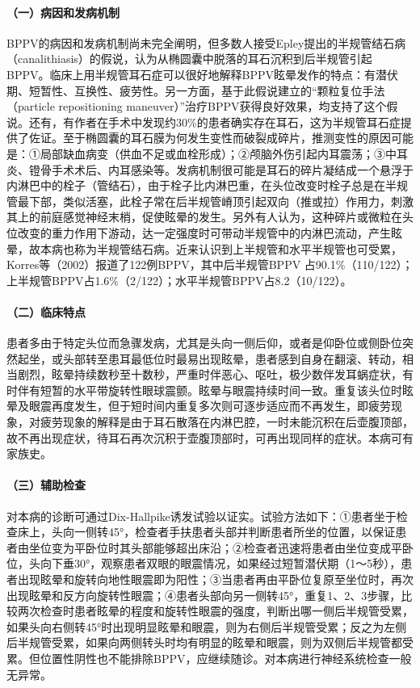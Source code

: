 \paragraph{（一）病因和发病机制}

BPPV的病因和发病机制尚未完全阐明，但多数人接受Epley提出的半规管结石病（canalithiasis）的假说，认为从椭圆囊中脱落的耳石沉积到后半规管引起BPPV。临床上用半规管耳石症可以很好地解释BPPV眩晕发作的特点：有潜伏期、短暂性、互换性、疲劳性。另一方面，基于此假说建立的“颗粒复位手法（particle
repositioning
maneuver）”治疗BPPV获得良好效果，均支持了这个假说。还有，有作者在手术中发现约30\%的患者确实存在耳石，这为半规管耳石症提供了佐证。至于椭圆囊的耳石膜为何发生变性而破裂成碎片，推测变性的原因可能是：①局部缺血病变（供血不足或血栓形成）；②颅脑外伤引起内耳震荡；③中耳炎、镫骨手术术后、内耳感染等。发病机制很可能是耳石的碎片凝结成一个悬浮于内淋巴中的栓子（管结石），由于栓子比内淋巴重，在头位改变时栓子总是在半规管最下部，类似活塞，此栓子常在后半规管嵴顶引起双向（推或拉）作用力，刺激其上的前庭感觉神经末梢，促使眩晕的发生。另外有人认为，这种碎片或微粒在头位改变的重力作用下游动，达一定强度时可带动半规管中的内淋巴流动，产生眩晕，故本病也称为半规管结石病。近来认识到上半规管和水平半规管也可受累，Korres等（2002）报道了122例BPPV，其中后半规管BPPV
占90.1\%（110/122）；上半规管BPPV占1.6\%（2/122）；水平半规管BPPV占8.2（10/122）。

\paragraph{（二）临床特点}

患者多由于特定头位而急骤发病，尤其是头向一侧后仰，或者是仰卧位或侧卧位突然起坐，或头部转至患耳最低位时最易出现眩晕，患者感到自身在翻滚、转动，相当剧烈，眩晕持续数秒至十数秒，严重时伴恶心、呕吐，极少数伴发耳蜗症状，有时伴有短暂的水平带旋转性眼球震颤。眩晕与眼震持续时间一致。重复该头位时眩晕及眼震再度发生，但于短时间内重复多次则可逐步适应而不再发生，即疲劳现象，对疲劳现象的解释是由于耳石散落在内淋巴腔，一时未能沉积在后壶腹顶部，故不再出现症状，待耳石再次沉积于壶腹顶部时，可再出现同样的症状。本病可有家族史。

\paragraph{（三）辅助检查}

对本病的诊断可通过Dix-Hallpike诱发试验以证实。试验方法如下：①患者坐于检查床上，头向一侧转45°，检查者手扶患者头部并判断患者所坐的位置，以保证患者由坐位变为平卧位时其头部能够超出床沿；②检查者迅速将患者由坐位变成平卧位，头向下垂30°，观察患者双眼的眼震情况，如果经过短暂潜伏期（1～5秒），患者出现眩晕和旋转向地性眼震即为阳性；③当患者再由平卧位复原至坐位时，再次出现眩晕和反方向旋转性眼震；④患者头部向另一侧转45°，重复1、2、3步骤，比较两次检查时患者眩晕的程度和旋转性眼震的强度，判断出哪一侧后半规管受累，如果头向右侧转45°时出现明显眩晕和眼震，则为右侧后半规管受累；反之为左侧后半规管受累，如果向两侧转头时均有明显的眩晕和眼震，则为双侧后半规管都受累。但位置性阴性也不能排除BPPV，应继续随诊。对本病进行神经系统检查一般无异常。

